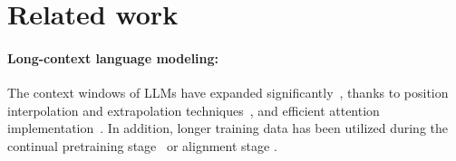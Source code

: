 \section{Related work}  
\paragraph{Long-context language modeling:}
The context windows of LLMs have expanded significantly~\cite{openai2024gpt4technicalreport, dubey2024llama, geminiteam2024gemini15unlockingmultimodal, yang_qwen25-1m_2025}, thanks to position interpolation and extrapolation techniques~\cite{press_train_2022, su_roformer_2023, peng_yarn_2023}, and efficient attention implementation~\cite{dao2022flashattentionfastmemoryefficientexact, dao2023flashattention2fasterattentionbetter,liu2023blockwise}. In addition, longer training data has been utilized during the continual pretraining stage~\cite{dubey2024llama, lieber2024jambahybridtransformermambalanguage, xiong_effective_2023} or alignment stage \cite{bai_longalign_2024, xiong2024artificialneedlesrealhaystacks,an2024makellmfullyutilize}.


